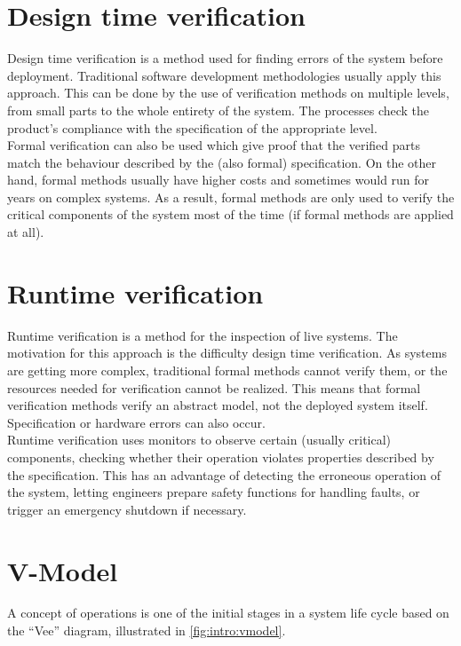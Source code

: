 \section{Design time verification}

Design time verification is a method used for finding errors of the system before deployment. Traditional software development methodologies usually apply this approach. This can be done by the use of verification methods on multiple levels, from small parts to the whole entirety of the system. The processes check the product’s compliance with the specification of the appropriate level.\\
Formal verification can also be used which give proof that the verified parts match the behaviour described by the (also formal) specification. On the other hand, formal methods usually have higher costs and sometimes would run for years on complex systems. As a result, formal methods are only used to verify the critical components of the system most of the time (if formal methods are applied at all).

\section{Runtime verification}

Runtime verification is a method for the inspection of live systems.  The motivation for this approach is the difficulty design time verification. As systems are getting more complex, traditional formal methods cannot verify them, or the resources needed for verification cannot be realized. This means that formal verification methods verify an abstract model, not the deployed system itself. Specification or hardware errors can also occur.\\
Runtime verification uses monitors to observe certain (usually critical) components, checking whether their operation violates properties described by the specification. This has an advantage of detecting the erroneous operation of the system, letting engineers prepare safety functions for handling faults, or trigger an emergency shutdown if necessary.

\section{V-Model}

A concept of operations is one of the initial stages in a system life cycle based on the “Vee” diagram, illustrated in \cref{fig:intro:vmodel}.

